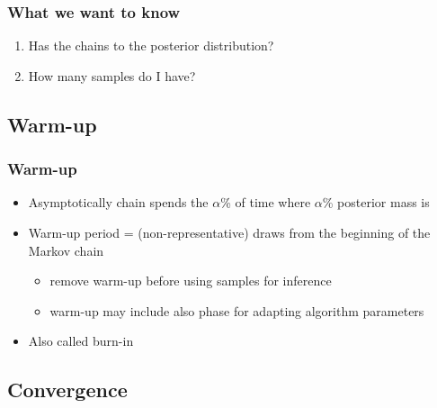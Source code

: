 \documentclass[10pt]{beamer}
\begin{document}
\begin{frame}

\frametitle{What we want to know}

  \begin{enumerate}
  \item Has the chains  to the posterior distribution?
  \item How many  samples do I have?
  \end{enumerate}

\end{frame}

\subsection{Warm-up}

\begin{frame}

\frametitle{Warm-up}

  \begin{itemize}
  \item Asymptotically chain spends the $\alpha$\% of time where
    $\alpha$\% posterior mass is
      \vspace{-.5\baselineskip}
    \item<3-> Warm-up period = (non-representative) draws from the beginning of the Markov chain
    \begin{itemize}
      \item remove warm-up before using samples for inference
      \item warm-up may include also phase for adapting algorithm parameters
      \end{itemize}
    \item<4-> Also called {\color{uured} burn-in}
  \end{itemize}

\end{frame}

\subsection{Convergence}
\end{document}
